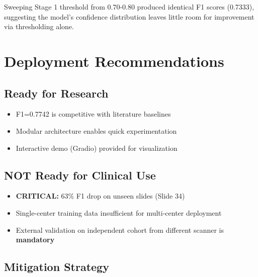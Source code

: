 \documentclass[11pt,a4paper]{article}
\begin{document}
Sweeping Stage 1 threshold from 0.70-0.80 produced identical 
F1 scores (0.7333), suggesting the model's confidence distribution 
leaves little room for improvement via thresholding alone.

\section{Deployment Recommendations}

\subsection{Ready for Research}

\begin{itemize}
    \item F1=0.7742 is competitive with literature baselines
    \item Modular architecture enables quick experimentation
    \item Interactive demo (Gradio) provided for visualization
\end{itemize}

\subsection{NOT Ready for Clinical Use}

\begin{itemize}
    \item \textbf{CRITICAL:} 63\% F1 drop on unseen slides (Slide 34)
    \item Single-center training data insufficient for multi-center deployment
    \item External validation on independent cohort from different scanner 
          is \textbf{mandatory}
\end{itemize}

\subsection{Mitigation Strategy}
\end{document}
